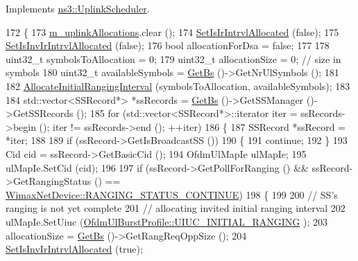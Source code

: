 Implements \hyperlink{classns3_1_1UplinkScheduler_a36fc5c58146f1fb828f21f109cb1634c}{ns3\+::\+Uplink\+Scheduler}.


\begin{DoxyCode}
172 \{
173   \hyperlink{classns3_1_1UplinkSchedulerSimple_a81eb434b3223cb1a0641c5cd82b04009}{m\_uplinkAllocations}.clear ();
174   \hyperlink{classns3_1_1UplinkScheduler_a3eee0d06486678eab4d352a274676d95}{SetIsIrIntrvlAllocated} (\textcolor{keyword}{false});
175   \hyperlink{classns3_1_1UplinkScheduler_a766e3b6c032052002929eb351934e42b}{SetIsInvIrIntrvlAllocated} (\textcolor{keyword}{false});
176   \textcolor{keywordtype}{bool} allocationForDsa = \textcolor{keyword}{false};
177 
178   uint32\_t symbolsToAllocation = 0;
179   uint32\_t allocationSize = 0; \textcolor{comment}{// size in symbols}
180   uint32\_t availableSymbols = \hyperlink{classns3_1_1UplinkScheduler_afe61b7de71d92d2dff1b135744a6ff7e}{GetBs} ()->GetNrUlSymbols ();
181 
182   \hyperlink{classns3_1_1UplinkSchedulerSimple_a113550ccdc47d1ee91efe0b3cc801824}{AllocateInitialRangingInterval} (symbolsToAllocation, availableSymbols);
183 
184   std::vector<SSRecord*> *ssRecords = \hyperlink{classns3_1_1UplinkScheduler_afe61b7de71d92d2dff1b135744a6ff7e}{GetBs} ()->GetSSManager ()->GetSSRecords ();
185   \textcolor{keywordflow}{for} (std::vector<SSRecord*>::iterator iter = ssRecords->begin (); iter != ssRecords->end (); ++iter)
186     \{
187       SSRecord *ssRecord = *iter;
188 
189       \textcolor{keywordflow}{if} (ssRecord->GetIsBroadcastSS ())
190         \{
191           \textcolor{keywordflow}{continue};
192         \}
193       Cid cid = ssRecord->GetBasicCid ();
194       OfdmUlMapIe ulMapIe;
195       ulMapIe.SetCid (cid);
196 
197       \textcolor{keywordflow}{if} (ssRecord->GetPollForRanging () && ssRecord->GetRangingStatus () == 
      \hyperlink{classns3_1_1WimaxNetDevice_a2a74c0f01e51abc1851a630242e7b591ace0a03105b6d7cf2c6ec79e9789dc3a6}{WimaxNetDevice::RANGING\_STATUS\_CONTINUE})
198         \{
199 
200           \textcolor{comment}{// SS's ranging is not yet complete}
201           \textcolor{comment}{// allocating invited initial ranging interval}
202           ulMapIe.SetUiuc (\hyperlink{classns3_1_1OfdmUlBurstProfile_ae528783c4b3c6700ff49dfd7a555cb3daaea7b6256d4bcd0125f0248c0560c94e}{OfdmUlBurstProfile::UIUC\_INITIAL\_RANGING}
      );
203           allocationSize = \hyperlink{classns3_1_1UplinkScheduler_afe61b7de71d92d2dff1b135744a6ff7e}{GetBs} ()->GetRangReqOppSize ();
204           \hyperlink{classns3_1_1UplinkScheduler_a766e3b6c032052002929eb351934e42b}{SetIsInvIrIntrvlAllocated} (\textcolor{keyword}{true});

\end{DoxyCode}
